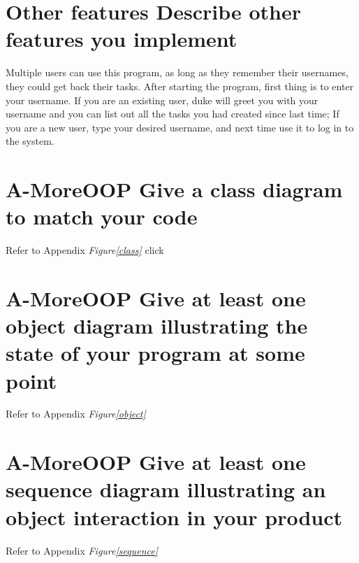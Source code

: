\documentclass[a4paper,11pt, twoside]{article}
\begin{document}
\begin{table} [htbp]
\section* {Other features Describe other features you implement} 
Multiple users can use this program, as long as they remember their usernames, they could get back their tasks. After starting the program, first thing is to enter your username. If you are an existing user, duke will greet you with your username and you can list out all the tasks you had created since last time; If you are a new user, type your desired username, and next time use it to log in to the system.  

\section* {A-MoreOOP Give a class diagram to match your code} 
Refer to Appendix \emph{Figure\ref{class}} \hookleftarrow  click

\section* {A-MoreOOP Give at least one object diagram illustrating the state of your program at some point} 
Refer to Appendix \emph{Figure\ref{object}} \hookleftarrow  

\section* {A-MoreOOP Give at least one sequence diagram illustrating an object interaction in your product} 
Refer to Appendix \emph{Figure\ref{sequence}} \hookleftarrow  


\end{table}
\end{document}
